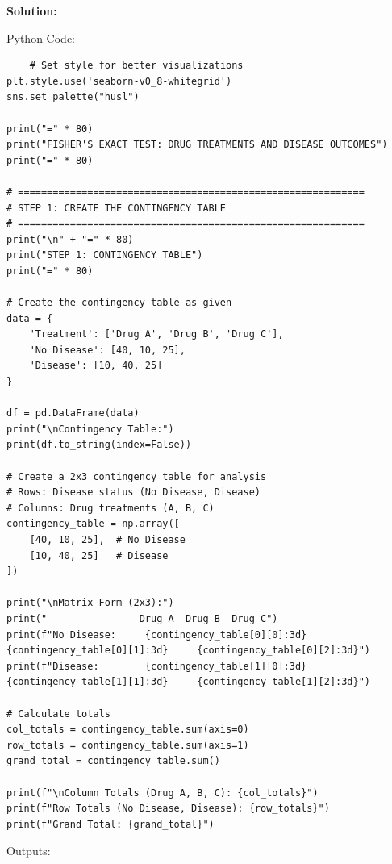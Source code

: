 \documentclass[12pt]{article}
\begin{document}
{\large\textbf{Solution:}}

\vspace{0.1cm}

{\large{Python Code:}}

\vspace{0.2cm}

\begin{verbatim}
    # Set style for better visualizations
plt.style.use('seaborn-v0_8-whitegrid')
sns.set_palette("husl")

print("=" * 80)
print("FISHER'S EXACT TEST: DRUG TREATMENTS AND DISEASE OUTCOMES")
print("=" * 80)

# ============================================================
# STEP 1: CREATE THE CONTINGENCY TABLE
# ============================================================
print("\n" + "=" * 80)
print("STEP 1: CONTINGENCY TABLE")
print("=" * 80)

# Create the contingency table as given
data = {
    'Treatment': ['Drug A', 'Drug B', 'Drug C'],
    'No Disease': [40, 10, 25],
    'Disease': [10, 40, 25]
}

df = pd.DataFrame(data)
print("\nContingency Table:")
print(df.to_string(index=False))

# Create a 2x3 contingency table for analysis
# Rows: Disease status (No Disease, Disease)
# Columns: Drug treatments (A, B, C)
contingency_table = np.array([
    [40, 10, 25],  # No Disease
    [10, 40, 25]   # Disease
])

print("\nMatrix Form (2x3):")
print("                Drug A  Drug B  Drug C")
print(f"No Disease:     {contingency_table[0][0]:3d}     {contingency_table[0][1]:3d}     {contingency_table[0][2]:3d}")
print(f"Disease:        {contingency_table[1][0]:3d}     {contingency_table[1][1]:3d}     {contingency_table[1][2]:3d}")

# Calculate totals
col_totals = contingency_table.sum(axis=0)
row_totals = contingency_table.sum(axis=1)
grand_total = contingency_table.sum()

print(f"\nColumn Totals (Drug A, B, C): {col_totals}")
print(f"Row Totals (No Disease, Disease): {row_totals}")
print(f"Grand Total: {grand_total}")
\end{verbatim}

\vspace{0.2cm}

\vspace{0.1cm}

{\large{Outputs:}}

\vspace{0.2cm}
\end{document}
